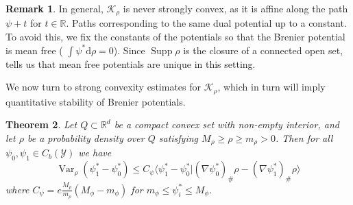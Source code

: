 \documentclass[11pt, oneside, titlepage]{book}
\theoremstyle{plain}
\newtheorem{theorem}{Theorem}[chapter]
\theoremstyle{definition}
\newtheorem{remark}[theorem]{Remark}
\newcommand{\R}{\mathbb{R}}
\newcommand{\K}{\mathcal{K}}
\newcommand{\Y}{\mathcal{Y}}
\newcommand{\di}{\mathrm{d}}
\DeclareMathOperator{\var}{Var}
\DeclareMathOperator{\supp}{Supp}
\begin{document}
\begin{remark}
    In general, $\K_\rho$ is never strongly convex, as it is affine along the path $\psi + t$ for $t \in \R$. Paths corresponding to the same dual potential up to a constant. To avoid this, we fix the constants of the potentials so that the Brenier potential is mean free ( $\int \psi^* \di \rho = 0$). Since  $\supp \rho$ is the closure of a connected open set, \cite[Proposition 7.18]{santambrogio2015optimal} tells us that mean free potentials are unique in this setting.
\end{remark}
We now turn to strong convexity estimates for $\K_\rho$, which in turn will imply quantitative stability of Brenier potentials.
\begin{theorem}\textnormal{\cite[Theorem 2.1]{delalande2023quantitative}\cite[Theorem 2.1]{letrouit2024gluing}}
\label{thrm: strong convexity weak version}
    Let $Q \subset \R^d$ be a compact convex set with non-empty interior, and let $\rho$ be a probability density over $Q$ satisfying $M_\rho \geq \rho \geq m_\rho >0$. Then for all $\psi_0, \psi_1 \in C_b(\Y)$ we have
    \begin{equation*}
        \var_\rho(\psi_1^* - \psi_0^*) \leq C_\psi \langle \psi^*_1 - \psi_0^* | (\nabla \psi_0^*)_\#\rho - (\nabla \psi_1^*)_\#\rho \rangle
    \end{equation*}
    where $C_\psi = e \frac{M_\rho}{m_\rho} (M_\phi - m_\phi)$ for $m_\phi \leq \psi_i^* \leq M_\phi$.
\end{theorem}
\end{document}
